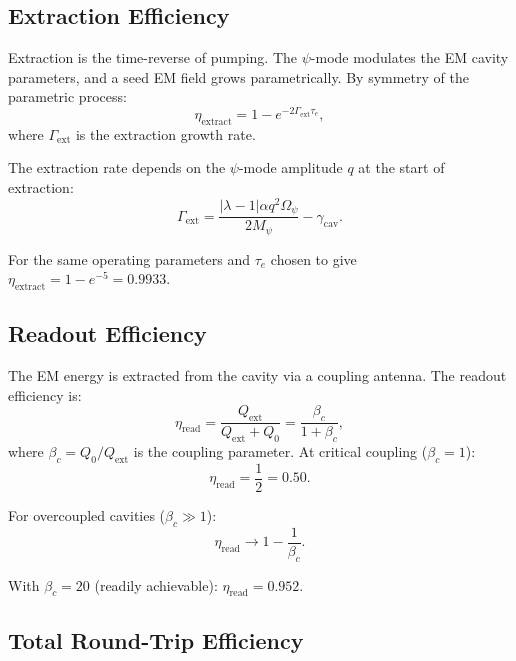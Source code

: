 \documentclass[aps,prd,twocolumn,showpacs,preprintnumbers,superscriptaddress,nofootinbib]{revtex4-2}
\newcommand{\Mpsi}{M_\psi}
\newcommand{\Opsi}{\Omega_\psi}
\begin{document}
\subsection{Extraction Efficiency}\label{sec:extract-eff}

Extraction is the time-reverse of pumping.  The $\psi$-mode modulates
the EM cavity parameters, and a seed EM field grows parametrically.
By symmetry of the parametric process:
\begin{equation}\label{eq:eta-extract}
\eta_{\mathrm{extract}} = 1 - e^{-2\Gamma_{\mathrm{ext}}\tau_e},
\end{equation}
where $\Gamma_{\mathrm{ext}}$ is the extraction growth rate.

The extraction rate depends on the $\psi$-mode amplitude $q$ at the
start of extraction:
\begin{equation}
\Gamma_{\mathrm{ext}} = \frac{|\lambda-1|\alpha q^2\Opsi}{2\Mpsi}
  - \gamma_{\mathrm{cav}}.
\end{equation}

For the same operating parameters and $\tau_e$ chosen to give
$\eta_{\mathrm{extract}} = 1 - e^{-5} = 0.9933$.

\subsection{Readout Efficiency}\label{sec:readout-eff}

The EM energy is extracted from the cavity via a coupling antenna.
The readout efficiency is:
\begin{equation}\label{eq:eta-read}
\eta_{\mathrm{read}} = \frac{Q_{\mathrm{ext}}}{Q_{\mathrm{ext}} + Q_0}
  = \frac{\beta_c}{1 + \beta_c},
\end{equation}
where $\beta_c = Q_0/Q_{\mathrm{ext}}$ is the coupling parameter.
At critical coupling ($\beta_c = 1$):
\begin{equation}
\eta_{\mathrm{read}} = \frac{1}{2} = 0.50.
\end{equation}

For overcoupled cavities ($\beta_c \gg 1$):
\begin{equation}
\eta_{\mathrm{read}} \to 1 - \frac{1}{\beta_c}.
\end{equation}

With $\beta_c = 20$ (readily achievable): $\eta_{\mathrm{read}} = 0.952$.

\subsection{Total Round-Trip Efficiency}\label{sec:total-eff}
\end{document}
